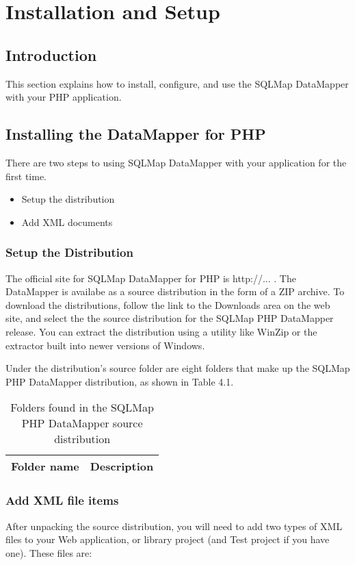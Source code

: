 \chapter{Installation and Setup}\label{section:4.3}
\section{Introduction}
This section explains how to install, configure, and use the SQLMap DataMapper
with your PHP application.

\section{Installing the DataMapper for PHP}
There are two steps to using SQLMap DataMapper with your application for the
first time.
\begin{itemize}
  \item Setup the distribution
  \item Add XML documents
\end{itemize}

\subsection{Setup the Distribution}

The official site for SQLMap DataMapper for PHP is http://... . The DataMapper
is availabe as a source distribution in the form of a ZIP archive. To download
the distributions, follow the link to the Downloads area on the web site, and
select the the source distribution for the SQLMap PHP DataMapper release. You
can extract the distribution using a utility like WinZip or the extractor
built into newer versions of Windows.

Under the distribution's source folder are eight folders that make up the
SQLMap PHP DataMapper distribution, as shown in Table 4.1.

\begin{table}[!hpt]
\caption{Folders found in the SQLMap PHP DataMapper source distribution}
\label{table:4.1}
 \centering
\begin{tabular}{|l|l|}
\hline
 \textbf{Folder name} & \textbf{Description} \\
 \hline
\end{tabular}
\end{table}

\subsection{Add XML file items}
After unpacking the source distribution, you will need to add two types of XML
files to your Web application, or library project (and Test project if you
have one). These files are:

